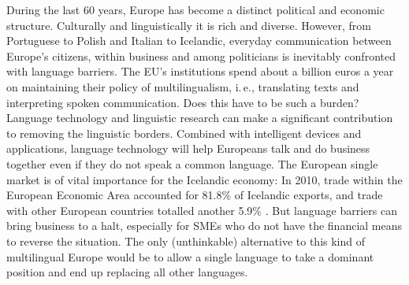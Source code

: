 \documentclass{../../metanetpaper}
\begin{document}

\setcounter{section}{0}
\setcounter{figure}{0}

\cleardoublepage



\begin{multicols}{2}

During the last 60 years, Europe has become a distinct political and economic structure. Culturally and linguistically it is rich and diverse. However, from Portuguese to Polish and Italian to Icelandic, everyday communication between Europe’s citizens, within business and among politicians is inevitably confronted with language barriers. The EU's institutions spend about a billion euros a year on maintaining their policy of multilingualism, i.\,e., translating texts and interpreting spoken communication. Does this have to be such a burden? Language technology and linguistic research can make a significant contribution to removing the linguistic borders. Combined with intelligent devices and applications, language technology will help Europeans talk and do business together even if they do not speak a common language.  The European single market is of vital importance for the Icelandic economy: In 2010, trade within the European Economic Area accounted for 81.8\% of Icelandic exports, and trade with other European countries totalled another 5.9\% \cite{hag3}. But language barriers can bring business to a halt, especially for SMEs who do not have the financial means to reverse the situation. The only (unthinkable) alternative to this kind of multilingual Europe would be to allow a single language to take a dominant position and end up replacing all other languages.


\end{multicols}
\end{document}
